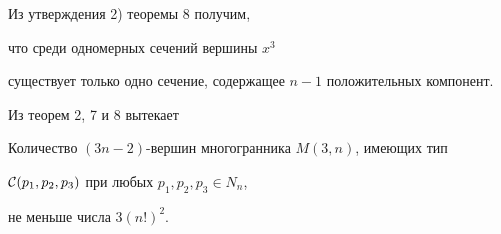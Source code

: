 Из утверждения 2) теоремы 8 получим, 


что среди одномерных сечений вершины $x^3$


существует только одно сечение, содержащее $n-1$ положительных компонент.





Из теорем 2, 7 и 8 вытекает





\begin{cor}


Количество $(3n-2)$-вершин многогранника $M(3,n)$, имеющих тип


${\cal C}(p_1,p_2,p_3)$ при любых $p_1,p_2,p_3\in N_n$,


не меньше числа $3(n!)^2$.


\end{cor}









